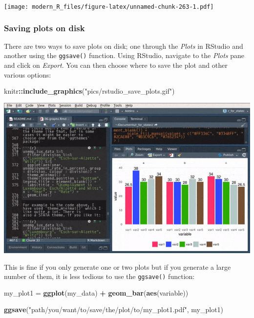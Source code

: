 \documentclass[]{gitbook}
\newenvironment{Shaded}{\begin{snugshade}}{\end{snugshade}}
\newcommand{\KeywordTok}[1]{\textcolor[rgb]{0.13,0.29,0.53}{\textbf{#1}}}
\newcommand{\NormalTok}[1]{#1}
\newcommand{\OperatorTok}[1]{\textcolor[rgb]{0.81,0.36,0.00}{\textbf{#1}}}
\newcommand{\StringTok}[1]{\textcolor[rgb]{0.31,0.60,0.02}{#1}}
\theoremstyle{definition}
\theoremstyle{definition}
\theoremstyle{definition}
\theoremstyle{remark}
\begin{document}
\texttt{[image: modern\_R\_files/figure-latex/unnamed-chunk-263-1.pdf]}

\hypertarget{saving-plots-on-disk}{%
\subsubsection{Saving plots on disk}\label{saving-plots-on-disk}}

There are two ways to save plots on disk; one through the \emph{Plots}
in RStudio and another using the \texttt{ggsave()} function. Using
RStudio, navigate to the \emph{Plots} pane and click on \emph{Export}.
You can then choose where to save the plot and other various options:

\begin{Shaded}
\begin{Highlighting}[]
\NormalTok{knitr}\OperatorTok{::}\KeywordTok{include_graphics}\NormalTok{(}\StringTok{"pics/rstudio_save_plots.gif"}\NormalTok{)}
\end{Highlighting}
\end{Shaded}

\includegraphics{pics/rstudio_save_plots.gif}

This is fine if you only generate one or two plots but if you generate a
large number of them, it is less tedious to use the \texttt{ggsave()}
function:

\begin{Shaded}
\begin{Highlighting}[]
\NormalTok{my_plot1 =}\StringTok{ }\KeywordTok{ggplot}\NormalTok{(my_data) }\OperatorTok{+}
\StringTok{  }\KeywordTok{geom_bar}\NormalTok{(}\KeywordTok{aes}\NormalTok{(variable))}

\KeywordTok{ggsave}\NormalTok{(}\StringTok{"path/you/want/to/save/the/plot/to/my_plot1.pdf"}\NormalTok{, my_plot1)}
\end{Highlighting}
\end{Shaded}
\end{document}
